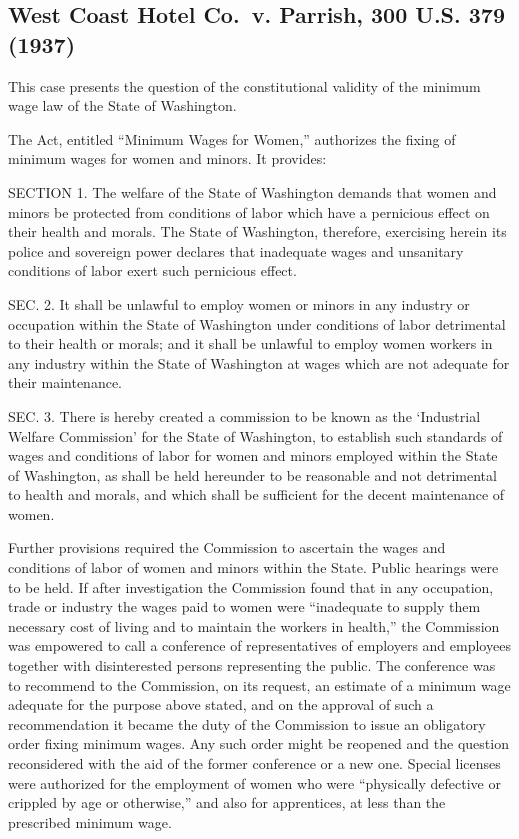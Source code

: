 \documentclass[
  letterpaper,
  11pt,
  DIV=9,
  openright]{scrbook}
\renewenvironment{quote}{
  \list{}{\leftmargin=2em\rightmargin=2em}
  \item\relax\small
}
{\endlist}
\begin{document}
\subsection{West Coast Hotel Co.~v. Parrish, 300 U.S. 379
(1937)}\label{west-coast-hotel-co.-v.-parrish-300-u.s.-379-1937}

This case presents the question of the constitutional validity of the
minimum wage law of the State of Washington.

The Act, entitled ``Minimum Wages for Women,'' authorizes the fixing of
minimum wages for women and minors. It provides:

\begin{quote}
SECTION 1. The welfare of the State of Washington demands that women and
minors be protected from conditions of labor which have a pernicious
effect on their health and morals. The State of Washington, therefore,
exercising herein its police and sovereign power declares that
inadequate wages and unsanitary conditions of labor exert such
pernicious effect.
\end{quote}

\begin{quote}
SEC. 2. It shall be unlawful to employ women or minors in any industry
or occupation within the State of Washington under conditions of labor
detrimental to their health or morals; and it shall be unlawful to
employ women workers in any industry within the State of Washington at
wages which are not adequate for their maintenance.
\end{quote}

\begin{quote}
SEC. 3. There is hereby created a commission to be known as the
`Industrial Welfare Commission' for the State of Washington, to
establish such standards of wages and conditions of labor for women and
minors employed within the State of Washington, as shall be held
hereunder to be reasonable and not detrimental to health and morals, and
which shall be sufficient for the decent maintenance of women.
\end{quote}

Further provisions required the Commission to ascertain the wages and
conditions of labor of women and minors within the State. Public
hearings were to be held. If after investigation the Commission found
that in any occupation, trade or industry the wages paid to women were
``inadequate to supply them necessary cost of living and to maintain the
workers in health,'' the Commission was empowered to call a conference
of representatives of employers and employees together with
disinterested persons representing the public. The conference was to
recommend to the Commission, on its request, an estimate of a minimum
wage adequate for the purpose above stated, and on the approval of such
a recommendation it became the duty of the Commission to issue an
obligatory order fixing minimum wages. Any such order might be reopened
and the question reconsidered with the aid of the former conference or a
new one. Special licenses were authorized for the employment of women
who were ``physically defective or crippled by age or otherwise,'' and
also for apprentices, at less than the prescribed minimum wage.
\end{document}
